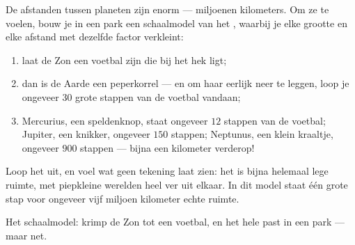 \begin{method}\label{met:g4:solar-system:model}
De afstanden tussen planeten zijn enorm --- miljoenen kilometers. Om
ze te voelen, bouw je in een park een schaalmodel van het
, waarbij je elke grootte en elke afstand met dezelfde
factor verkleint:
\begin{enumerate}
  \item laat de Zon een voetbal zijn die bij het hek ligt;
  \item dan is de Aarde een peperkorrel --- en om haar eerlijk neer
        te leggen, loop je ongeveer $30$ grote stappen van de voetbal
        vandaan;
  \item Mercurius, een speldenknop, staat ongeveer $12$ stappen van
        de voetbal; Jupiter, een knikker, ongeveer $150$ stappen;
        Neptunus, een klein kraaltje, ongeveer $900$ stappen ---
        bijna een kilometer verderop!
\end{enumerate}
Loop het uit, en voel wat geen tekening laat zien: het
 is bijna helemaal lege ruimte, met piepkleine werelden
heel ver uit elkaar. In dit model staat één grote stap voor ongeveer
vijf miljoen kilometer echte ruimte.
\end{method}

\begin{omfigure}

{\small Het schaalmodel: krimp de Zon tot een voetbal, en het hele
 past in een park --- maar net.}
\end{omfigure}

